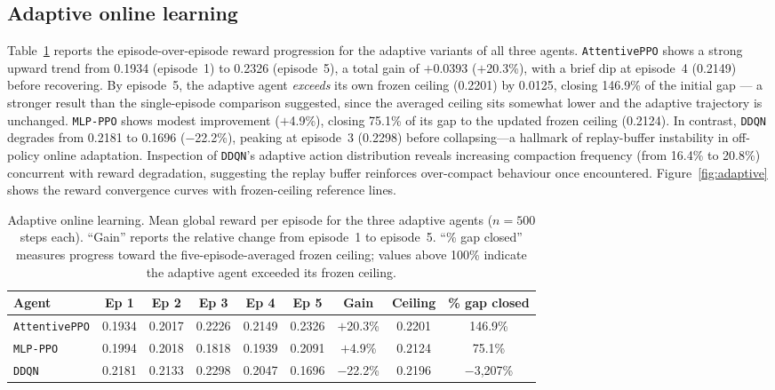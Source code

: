 \documentclass[fleqn,10pt]{wlscirep}
\newcommand{\attentive}{\texttt{AttentivePPO}}
\newcommand{\mlpppo}{\texttt{MLP-PPO}}
\newcommand{\ddqn}{\texttt{DDQN}}
\begin{document}
\FloatBarrier

\subsection*{Adaptive online learning}
\label{sec:adaptive}

Table~\ref{tab:adaptive} reports the episode-over-episode reward
progression for the adaptive variants of all three agents.
\attentive{} shows a strong upward trend from 0.1934 (episode~1) to 0.2326
(episode~5), a total gain of $+0.0393$ ($+$20.3\%), with a brief dip at
episode~4 (0.2149) before recovering.
By episode~5, the adaptive agent \emph{exceeds} its own frozen ceiling
(0.2201) by 0.0125, closing 146.9\% of the initial gap --- a stronger
result than the single-episode comparison suggested, since the averaged
ceiling sits somewhat lower and the adaptive trajectory is unchanged.
\mlpppo{} shows modest improvement ($+$4.9\%), closing 75.1\% of its
gap to the updated frozen ceiling (0.2124). In contrast, \ddqn{} degrades
from 0.2181 to 0.1696 ($-$22.2\%), peaking at episode~3 (0.2298) before
collapsing---a hallmark of replay-buffer instability in off-policy online
adaptation.
Inspection of \ddqn{}'s adaptive action distribution reveals increasing
compaction frequency (from 16.4\% to 20.8\%) concurrent with reward
degradation, suggesting the replay buffer reinforces over-compact
behaviour once encountered. Figure~\ref{fig:adaptive} shows the
reward convergence curves with frozen-ceiling reference lines.

\begin{table}[!htbp]
\centering
\begin{tabular}{lcccccccc}
\toprule
\textbf{Agent} & \textbf{Ep 1} & \textbf{Ep 2} & \textbf{Ep 3} &
  \textbf{Ep 4} & \textbf{Ep 5} & \textbf{Gain} &
  \textbf{Ceiling} & \textbf{\% gap closed} \\
\midrule
\attentive{} & 0.1934 & 0.2017 & 0.2226 & 0.2149 & 0.2326 &
  $+$20.3\% & 0.2201 & 146.9\% \\
\mlpppo{}    & 0.1994 & 0.2018 & 0.1818 & 0.1939 & 0.2091 &
  $+$4.9\%  & 0.2124 & 75.1\%  \\
\ddqn{}      & 0.2181 & 0.2133 & 0.2298 & 0.2047 & 0.1696 &
  $-$22.2\% & 0.2196 & $-$3,207\% \\
\bottomrule
\end{tabular}
\caption{\label{tab:adaptive}Adaptive online learning. Mean global reward per episode
  for the three adaptive agents ($n = 500$ steps each). ``Gain'' reports
  the relative change from episode~1 to episode~5. ``\% gap closed''
  measures progress toward the five-episode-averaged frozen ceiling;
  values above 100\% indicate the adaptive agent exceeded its frozen ceiling.}
\end{table}
\end{document}
